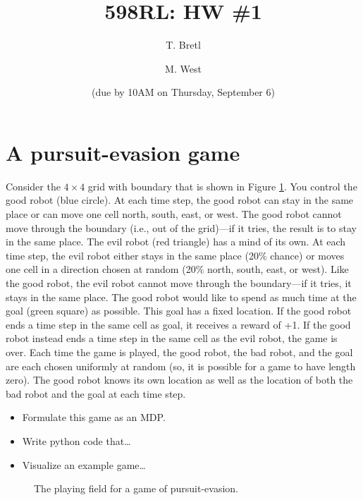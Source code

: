 \documentclass[12pt]{article}
\title{598RL: HW \#1}
\author{T. Bretl \and M. West}
\date{(due by 10AM on Thursday, September 6)}
\begin{document}
\maketitle


\section{A pursuit-evasion game}

Consider the $4\times4$ grid with boundary that is shown in Figure \ref{fig:pursuit}. You control the good robot (blue circle). At each time step, the good robot can stay in the same place or can move one cell north, south, east, or west. The good robot cannot move through the boundary (i.e., out of the grid)---if it tries, the result is to stay in the same place. The evil robot (red triangle) has a mind of its own. At each time step, the evil robot either stays in the same place (20\% chance) or moves one cell in a direction chosen at random (20\% north, south, east, or west). Like the good robot, the evil robot cannot move through the boundary---if it tries, it stays in the same place. The good robot would like to spend as much time at the goal (green square) as possible. This goal has a fixed location. If the good robot ends a time step in the same cell as goal, it receives a reward of +1. If the good robot instead ends a time step in the same cell as the evil robot, the game is over. Each time the game is played, the good robot, the bad robot, and the goal are each chosen uniformly at random (so, it is possible for a game to have length zero). The good robot knows its own location as well as the location of both the bad robot and the goal at each time step.
\begin{itemize}
\item Formulate this game as an MDP.
\item Write python code that\ldots
\item Visualize an example game\ldots
\end{itemize}

\begin{figure}[htbp]
\begin{center}
\caption{The playing field for a game of pursuit-evasion.}
\label{fig:pursuit}
\end{center}
\end{figure}







\end{document}
